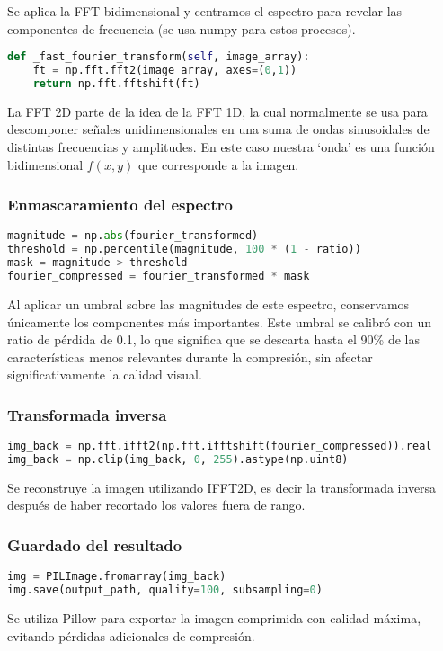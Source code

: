 Se aplica la FFT bidimensional y centramos el espectro para revelar las componentes de frecuencia (se usa numpy para estos procesos).

\begin{lstlisting}[language=Python, caption={Método \_fast\_fourier\_transform}, label={lst:fft2d}]
def _fast_fourier_transform(self, image_array):
    ft = np.fft.fft2(image_array, axes=(0,1))
    return np.fft.fftshift(ft)
\end{lstlisting}

La FFT 2D parte de la idea de la FFT 1D, la cual normalmente se usa para descomponer señales unidimensionales en una suma de ondas sinusoidales de distintas frecuencias y amplitudes. En este caso nuestra `onda' es una función bidimensional \(f(x,y)\) que corresponde a la imagen.

\subsubsection{Enmascaramiento del espectro}

\begin{lstlisting}[language=Python, caption={Enmascaramiento del espectro}, label={lst:masking}]
magnitude = np.abs(fourier_transformed)
threshold = np.percentile(magnitude, 100 * (1 - ratio))
mask = magnitude > threshold
fourier_compressed = fourier_transformed * mask
\end{lstlisting}

Al aplicar un umbral sobre las magnitudes de este espectro, conservamos únicamente los componentes más importantes. Este umbral se calibró con un ratio de pérdida de 0.1, lo que significa que se descarta hasta el 90\% de las características menos relevantes durante la compresión, sin afectar significativamente la calidad visual.

\subsubsection{Transformada inversa}

\begin{lstlisting}[language=Python, caption={Transformada inversa}, label={lst:inverse_transform}]
img_back = np.fft.ifft2(np.fft.ifftshift(fourier_compressed)).real
img_back = np.clip(img_back, 0, 255).astype(np.uint8)
\end{lstlisting}

Se reconstruye la imagen utilizando IFFT2D, es decir la transformada inversa después de haber recortado los valores fuera de rango.

\subsubsection{Guardado del resultado}

\begin{lstlisting}[language=Python, caption={Guardado de la imagen comprimida}, label={lst:save_image}]
img = PILImage.fromarray(img_back)
img.save(output_path, quality=100, subsampling=0)
\end{lstlisting}

Se utiliza Pillow para exportar la imagen comprimida con calidad máxima, evitando pérdidas adicionales de compresión.
